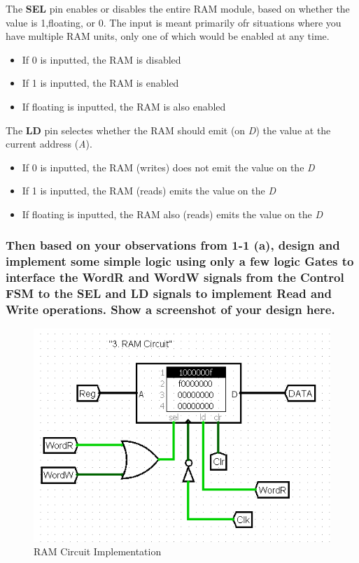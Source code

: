 \documentclass{article}
\begin{document}
	The \textbf{SEL} pin enables or disables the entire RAM module, based on whether the value is 1,floating, or 0. The input is meant primarily ofr situations where you have multiple RAM units, only one of which would be enabled at any time.
	\begin{itemize}
		\item If 0 is inputted, the RAM is disabled
		\item If 1 is inputted, the RAM is enabled
		\item If floating is inputted, the RAM is also enabled\\
	\end{itemize}	
	The \textbf{LD} pin selectes whether the RAM should emit (on \textit{D}) the value at the current address (\textit{A}).
	\begin{itemize}
		\item If 0 is inputted, the RAM (writes) does not emit the value on the \textit{D}
		\item If 1 is inputted, the RAM (reads) emits the value on the \textit{D}
		\item If floating is inputted, the RAM also (reads) emits the value on the \textit{D}\\
	\end{itemize}
	
	\subsubsection {Then based on your observations from 1-1 (a), design and implement some simple logic using only a few logic Gates to interface the WordR and WordW signals from the Control FSM to the SEL and LD signals to implement Read and Write operations. Show a screenshot of your design here.}
	
	\begin{figure}[!htb]
		\centering
		\includegraphics{RAM_circuit.png}
		\caption {RAM Circuit Implementation} 
	\end{figure}
	
\end{document}
